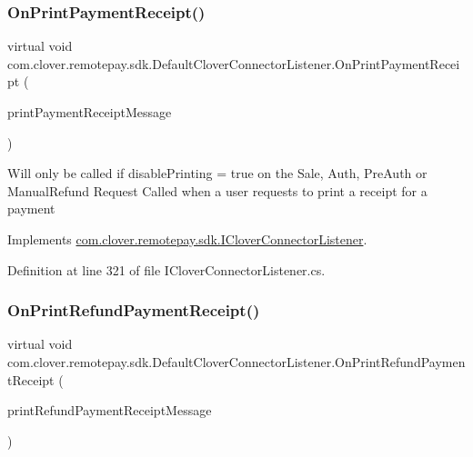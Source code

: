 \subsubsection{\texorpdfstring{On\+Print\+Payment\+Receipt()}{OnPrintPaymentReceipt()}}
{\footnotesize\ttfamily virtual void com.\+clover.\+remotepay.\+sdk.\+Default\+Clover\+Connector\+Listener.\+On\+Print\+Payment\+Receipt (\begin{DoxyParamCaption}\item[{\hyperlink{classcom_1_1clover_1_1remotepay_1_1sdk_1_1_print_payment_receipt_message}{Print\+Payment\+Receipt\+Message}}]{print\+Payment\+Receipt\+Message }\end{DoxyParamCaption})\hspace{0.3cm}{\ttfamily [virtual]}}



Will only be called if disable\+Printing = true on the Sale, Auth, Pre\+Auth or Manual\+Refund Request Called when a user requests to print a receipt for a payment 



Implements \hyperlink{interfacecom_1_1clover_1_1remotepay_1_1sdk_1_1_i_clover_connector_listener_ab37a0d5e7114499b3f1c55e38f6c46c9}{com.\+clover.\+remotepay.\+sdk.\+I\+Clover\+Connector\+Listener}.



Definition at line 321 of file I\+Clover\+Connector\+Listener.\+cs.

\mbox{\label{classcom_1_1clover_1_1remotepay_1_1sdk_1_1_default_clover_connector_listener_a13de716522e58beb9af010207e7362f2}} 
\subsubsection{\texorpdfstring{On\+Print\+Refund\+Payment\+Receipt()}{OnPrintRefundPaymentReceipt()}}
{\footnotesize\ttfamily virtual void com.\+clover.\+remotepay.\+sdk.\+Default\+Clover\+Connector\+Listener.\+On\+Print\+Refund\+Payment\+Receipt (\begin{DoxyParamCaption}\item[{\hyperlink{classcom_1_1clover_1_1remotepay_1_1sdk_1_1_print_refund_payment_receipt_message}{Print\+Refund\+Payment\+Receipt\+Message}}]{print\+Refund\+Payment\+Receipt\+Message }\end{DoxyParamCaption})\hspace{0.3cm}{\ttfamily [virtual]}}



